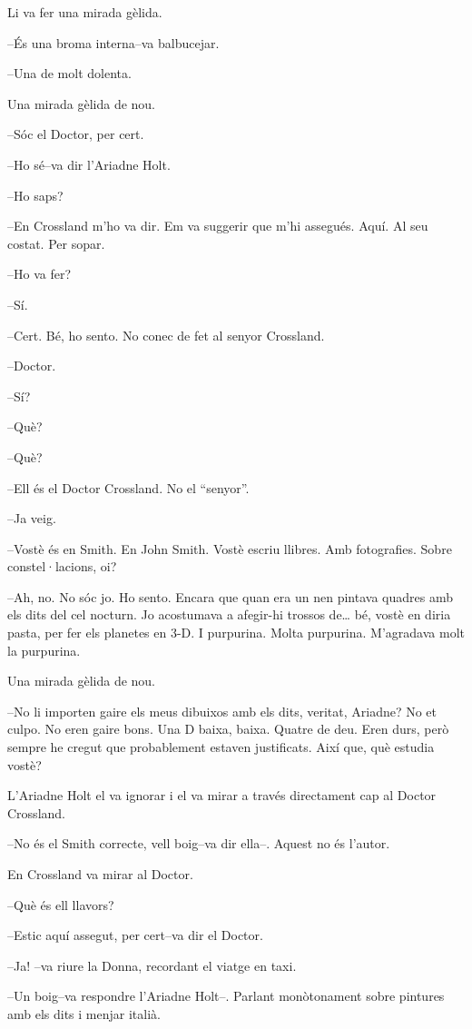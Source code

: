 Li va fer una mirada gèlida.

--És una broma interna--va balbucejar.

--Una de molt dolenta.

Una mirada gèlida de nou.

--Sóc el Doctor, per cert.

--Ho sé--va dir l'Ariadne Holt.

--Ho saps?

--En Crossland m'ho va dir. Em va suggerir que m'hi assegués. Aquí. Al
seu costat. Per sopar.

--Ho va fer?

--Sí.

--Cert. Bé, ho sento. No conec de fet al senyor Crossland.

--Doctor.

--Sí?

--Què?

--Què?

--Ell és el Doctor Crossland. No el ``senyor''.

--Ja veig.

--Vostè és en Smith. En John Smith. Vostè escriu llibres. Amb
fotografies. Sobre constel·lacions, oi?

--Ah, no. No sóc jo. Ho sento. Encara que quan era un nen pintava
quadres amb els dits del cel nocturn. Jo acostumava a afegir-hi trossos
de\ldots{} bé, vostè en diria pasta, per fer els planetes en 3-D. I
purpurina. Molta purpurina. M'agradava molt la purpurina.

Una mirada gèlida de nou.

--No li importen gaire els meus dibuixos amb els dits, veritat, Ariadne?
No et culpo. No eren gaire bons. Una D baixa, baixa. Quatre de deu. Eren
durs, però sempre he cregut que probablement estaven justificats. Així
que, què estudia vostè?

L'Ariadne Holt el va ignorar i el va mirar a través directament cap al
Doctor Crossland.

--No és el Smith correcte, vell boig--va dir ella--. Aquest no és
l'autor.

En Crossland va mirar al Doctor.

--Què és ell llavors?

--Estic aquí assegut, per cert--va dir el Doctor.

--Ja! --va riure la Donna, recordant el viatge en taxi.

--Un boig--va respondre l'Ariadne Holt--. Parlant monòtonament sobre
pintures amb els dits i menjar italià.


